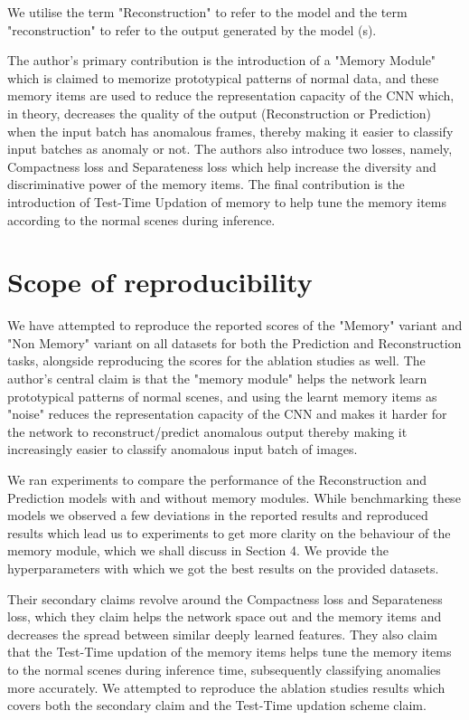 We utilise the term "Reconstruction" to refer to the model and the term "reconstruction" to refer to the output generated by the model (s).

The author’s primary contribution is the introduction of a "Memory Module" which is claimed to memorize prototypical patterns of normal data, and these memory items are used to reduce the representation capacity of the CNN which, in theory, decreases the quality of the output (Reconstruction or Prediction) when the input batch has anomalous frames, thereby making it easier to classify input batches as anomaly or not. The authors also introduce two losses, namely, Compactness loss and Separateness loss which help increase the diversity and discriminative power of the memory items. The final contribution is the introduction of Test-Time Updation of memory to help tune the memory items according to the normal scenes during inference.


\section{Scope of reproducibility}

We have attempted to reproduce the reported scores of the "Memory" variant and "Non Memory" variant on all datasets for both the Prediction and Reconstruction tasks, alongside reproducing the scores for the ablation studies as well. The author's central claim is that the "memory module" helps the network learn prototypical patterns of normal scenes, and using the learnt memory items as "noise" reduces the representation capacity of the CNN and makes it harder for the network to reconstruct/predict anomalous output thereby making it increasingly easier to classify anomalous input batch of images.

We ran experiments to compare the performance of the Reconstruction and Prediction models with and without memory modules. While benchmarking these models we observed a few deviations in the reported results and reproduced results which lead us to experiments to get more clarity on the behaviour of the memory module, which we shall discuss in Section 4. We provide the hyperparameters with which we got the best results on the provided datasets. 

Their secondary claims revolve around the Compactness loss and Separateness loss, which they claim helps the network space out and the memory items and decreases the spread between similar deeply learned features.  They also claim that the Test-Time updation of the memory items helps tune the memory items to the normal scenes during inference time, subsequently classifying anomalies more accurately. We attempted to reproduce the ablation studies results which covers both the secondary claim and the Test-Time updation scheme claim.


